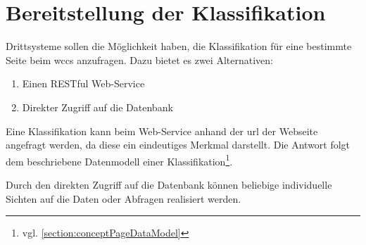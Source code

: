 \section{Bereitstellung der Klassifikation}
    Drittsysteme sollen die Möglichkeit haben,
    die Klassifikation für eine bestimmte Seite beim \gls{wccs} anzufragen.
    Dazu bietet es zwei Alternativen:

    \begin{enumerate}
        \item Einen RESTful Web-Service
        \item Direkter Zugriff auf die Datenbank
    \end{enumerate}

    Eine Klassifikation kann beim Web-Service anhand der \gls{url} der Webseite angefragt werden,
    da diese ein eindeutiges Merkmal darstellt.
    Die Antwort folgt dem beschriebene Datenmodell einer
    Klassifikation\footnote{vgl. \ref{section:conceptPageDataModel}}.

    Durch den direkten Zugriff auf die Datenbank können
    beliebige individuelle Sichten auf die Daten oder Abfragen realisiert werden.
